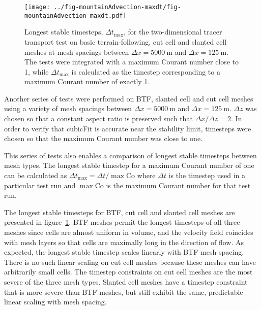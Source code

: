 \begin{figure}
	\centering
	\texttt{[image: ../fig-mountainAdvection-maxdt/fig-mountainAdvection-maxdt.pdf]}
	\caption{Longest stable timesteps, $\Delta t_\mathrm{max}$, for the two-dimensional tracer transport test on basic terrain-following, cut cell and slanted cell meshes at mesh spacings between $\Delta x = \SI{5000}{\meter}$ and $\Delta x = \SI{125}{\meter}$.  The tests were integrated with a maximum Courant number close to 1, while $\Delta t_\mathrm{max}$ is calculated as the timestep corresponding to a maximum Courant number of exactly 1.
	}
	\label{fig:mountainAdvection-maxdt}
\end{figure}

Another series of tests were performed on BTF, slanted cell and cut cell meshes using a variety of mesh spacings between $\Delta x = \SI{5000}{\meter}$ and $\Delta x = \SI{125}{\meter}$.  $\Delta z$ was chosen so that a constant aspect ratio is preserved such that $\Delta x / \Delta z = 2$.  In order to verify that cubicFit is accurate near the stability limit, timesteps were chosen so that the maximum Courant number was close to one.  

This series of tests also enables a comparison of longest stable timesteps between mesh types.  The longest stable timestep for a maximum Courant number of one can be calculated as $\Delta t_\mathrm{max} = \Delta t / \max{\mathrm{Co}}$ where $\Delta t$ is the timestep used in a particular test run and $\max{\mathrm{Co}}$ is the maximum Courant number for that test run.

The longest stable timesteps for BTF, cut cell and slanted cell meshes are presented in figure~\ref{fig:mountainAdvection-maxdt}.  BTF meshes permit the longest timesteps of all three meshes since cells are almost uniform in volume, and the velocity field coincides with mesh layers so that cells are maximally long in the direction of flow.  As expected, the longest stable timestep scales linearly with BTF mesh spacing.
There is no such linear scaling on cut cell meshes because these meshes can have arbitrarily small cells.  The timestep constraints on cut cell meshes are the most severe of the three mesh types.  Slanted cell meshes have a timestep constraint that is more severe than BTF meshes, but still exhibit the same, predictable linear scaling with mesh spacing.

